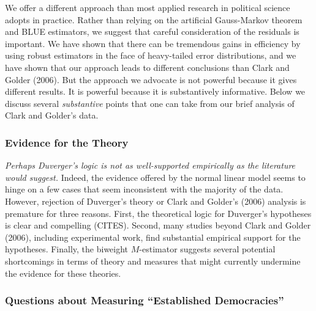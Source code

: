\documentclass[12pt]{article}
\begin{document}
We offer a different approach than most applied research in political science adopts in practice. Rather than relying on the artificial Gauss-Markov theorem and BLUE estimators, we suggest that careful consideration of the residuals is important. We have shown that there can be tremendous gains in efficiency by using robust estimators in the face of heavy-tailed error distributions, and we have shown that our approach leads to different conclusions than Clark and Golder (2006). But the approach we advocate is not powerful because it gives different results. It is powerful because it is substantively informative. Below we discuss several \textit{substantive} points that one can take from our brief analysis of Clark and Golder's data.

\subsubsection*{Evidence for the Theory}

\textit{Perhaps Duverger's logic is not as well-supported empirically as the literature would suggest.} Indeed, the evidence offered by the normal linear model seems to hinge on a few cases that seem inconsistent with the majority of the data. However, rejection of Duverger's theory or Clark and Golder's (2006) analysis is premature for three reasons. First, the theoretical logic for Duverger's hypotheses is clear and compelling (CITES). Second, many studies beyond Clark and Golder (2006), including experimental work, find substantial empirical support for the hypotheses. Finally, the biweight $M$-estimator suggests several potential shortcomings in terms of theory and measures that might currently undermine the evidence for these theories.

\subsubsection*{Questions about Measuring ``Established Democracies''}
\end{document}
